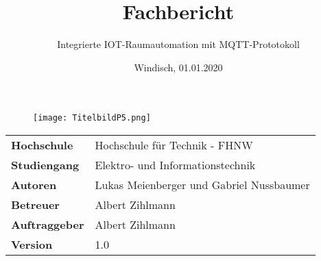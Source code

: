 \documentclass[final]{fhnwreport}         %
\title{Fachbericht}  %
\author{Integrierte IOT-Raumautomation mit MQTT-Prototokoll}                      %
\date{Windisch, 01.01.2020}               %
\begin{document}
\maketitle

\vspace*{-1cm}
\vfill
\begin{figure}[H]
\centering
\texttt{[image: TitelbildP5.png]}
\end{figure}
\vfill

\begin{center}
\renewcommand\arraystretch{2}
\begin{tabular}{>{\bf}p{4cm} l}
Hochschule                 &    Hochschule für Technik - FHNW\\
Studiengang                &    Elektro- und Informationstechnik\\
Autoren   		                 & 	 Lukas Meienberger und Gabriel Nussbaumer\\
Betreuer                   &     Albert Zihlmann\\
Auftraggeber               &    Albert Zihlmann\\
Version                    &    1.0 %
\end{tabular}
\end{center}

\clearpage
			
\thispagestyle{empty}


\tableofcontents
\clearpage










{\sloppypar
\printbibliography[heading=bibintoc]
}

%

\end{document}
